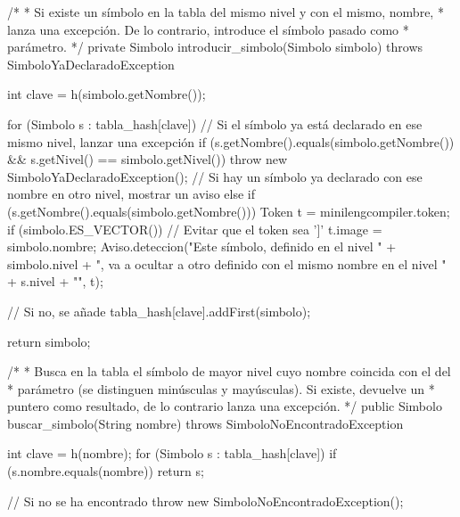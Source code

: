 \begin{codigo}[style=java,caption={Función \url{lib.semantico.TablaSimbolos.introducir_simbolo}},label={introducir}]
	/*
	 * Si existe un símbolo en la tabla del mismo nivel y con el mismo, nombre,
	 * lanza una excepción. De lo contrario, introduce el símbolo pasado como
	 * parámetro.
	 */
	private Simbolo introducir_simbolo(Simbolo simbolo) throws SimboloYaDeclaradoException {
		int clave = h(simbolo.getNombre());

		for (Simbolo s : tabla_hash[clave]) {
			// Si el símbolo ya está declarado en ese mismo nivel, lanzar una excepción
			if (s.getNombre().equals(simbolo.getNombre()) && s.getNivel() == simbolo.getNivel()) {
				throw new SimboloYaDeclaradoException();
			}
			// Si hay un símbolo ya declarado con ese nombre en otro nivel, mostrar un aviso
			else if (s.getNombre().equals(simbolo.getNombre())) {
				Token t = minilengcompiler.token;
				if (simbolo.ES_VECTOR()) {
					// Evitar que el token sea ']'
					t.image = simbolo.nombre;
				}
				Aviso.deteccion("Este símbolo, definido en el nivel " + simbolo.nivel +
						", va a ocultar a otro definido con el mismo nombre en el nivel " + s.nivel + "",
						t);
			}
		}

		// Si no, se añade
		tabla_hash[clave].addFirst(simbolo);

		return simbolo;
	}
\end{codigo}


\begin{codigo}[style=java,caption={Función \url{lib.semantico.TablaSimbolos.buscar_simbolo}},label={buscar}]
/*
 * Busca en la tabla el símbolo de mayor nivel cuyo nombre coincida con el del
 * parámetro (se distinguen minúsculas y mayúsculas). Si existe, devuelve un
 * puntero como resultado, de lo contrario lanza una excepción.
 */
public Simbolo buscar_simbolo(String nombre) throws SimboloNoEncontradoException {
    int clave = h(nombre);
    for (Simbolo s : tabla_hash[clave]) {
        if (s.nombre.equals(nombre)) {
            return s;
        }
    }

    // Si no se ha encontrado
    throw new SimboloNoEncontradoException();
}
\end{codigo}
